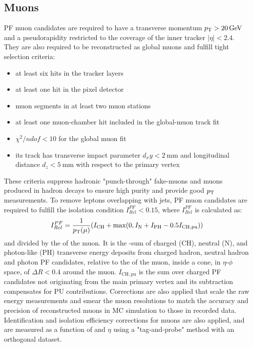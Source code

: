 \subsection{Muons}
PF muon candidates are required to have a transverse momentum $\pT > \SI{20}{\GeV}$ and a pseudorapidity restricted to the coverage of the inner tracker $\vert \eta \vert < 2.4$.
They are also required to be reconstructed as global muons and fulfill tight selection criteria: 
\begin{itemize}
    \item at least six hits in the tracker layers
    \item at least one hit in the pixel detector
    \item muon segments in at least two muon stations
    \item at least one muon-chamber hit included in the global-muon track fit
    \item $\chi^2/ndof < 10$ for the global muon fit
    \item its track has transverse impact parameter $d_xy< \SI{2}{\mm}$ and longitudinal distance $d_z< \SI{5}{\mm}$ with respect to the primary vertex
\end{itemize}
These criteria suppress hadronic "punch-through" fake-muons and muons produced in hadron decays to ensure high purity and provide good $p_{\mathrm{T}}$ measurements.
To remove leptons overlapping with jets, PF muon candidates are required to fulfill the isolation condition $I^{PF}_{Rel}< 0.15$, where $I^{PF}_{Rel}$ is calculated as: 
\begin{align}
I^{PF}_{Rel} = \frac{1}{p_{\mathrm{T}}(\mu)}(I_\mathrm{CH} + \max(0, I_\mathrm{N} + I_\mathrm{PH} - 0.5 I_\mathrm{CH,pu}))
\end{align}
and divided by the \pT of the muon.
It is the \pT-sum of charged (CH), neutral (N), and photon-like (PH) transverse energy deposits from charged hadron, neutral hadron and photon PF candidates, relative to the \pT of the muon, inside a cone, in $\eta$-$\phi$ space, of $\Delta R < 0.4$ around the muon.
$I_\mathrm{CH,pu}$ is the sum over charged PF candidates not originating from the main primary vertex and its subtraction compensates for PU contributions. 
Corrections are also applied that scale the raw energy measurements and smear the muon resolutions to match the accuracy and precision of reconstructed muons in MC simulation to those in recorded data.
Identification and isolation efficiency corrections for muons are also applied, and are measured as a function of \pT and $\eta$ using a "tag-and-probe" method with an orthogonal dataset.

